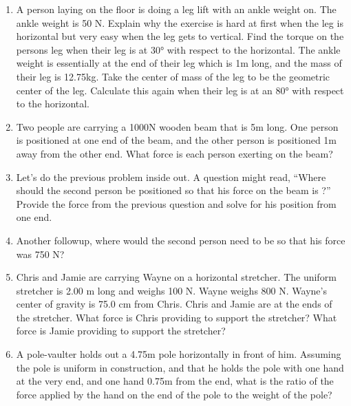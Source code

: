 \begin{enumerate}
	\item
	A person laying on the floor is doing a leg lift with an ankle weight on. The ankle weight is 50 N. Explain why the exercise is hard at first when the leg is horizontal but very easy when the leg gets to vertical. Find the torque on the persons leg when their leg is at \ang{30} with respect to the horizontal. The ankle weight is essentially at the end of their leg which is 1m long, and the mass of their leg is 12.75kg. Take the center of mass of the leg to be the geometric center of the leg. Calculate this again when their leg is at an \ang{80} with respect to the horizontal.\hugeskip
	
	\item
	Two people are carrying a 1000N wooden beam that is 5m long. One person is positioned at one end of the beam, and the other person is positioned 1m away from the other end. What force is each person exerting on the beam?\hugeskip
	
	\item 
	Let's do the previous problem inside out. A question might read, ``Where should the second person be positioned so that his force on the beam is \blank?'' Provide the force from the previous question and solve for his position from one end.
	
	\item 
	Another followup, where would the second person need to be so that his force was 750 N?\hugeskip
	
	\item
	Chris and Jamie are carrying Wayne on a horizontal stretcher. The uniform stretcher is 2.00 m long and weighs 100 N. Wayne weighs 800 N. Wayne's center of gravity is 75.0 cm from Chris. Chris and Jamie are at the ends of the stretcher. What force is Chris providing to support the stretcher? What force is Jamie providing to support the stretcher?\hugeskip
	
	\item
	A pole-vaulter holds out a 4.75m pole horizontally in front of him. Assuming the pole is uniform in construction, and that he holds the pole with one hand at the very end, and one hand 0.75m from the end, what is the ratio of the force applied by the hand on the end of the pole to the weight of the pole?\hugeskip
	

\end{enumerate}
